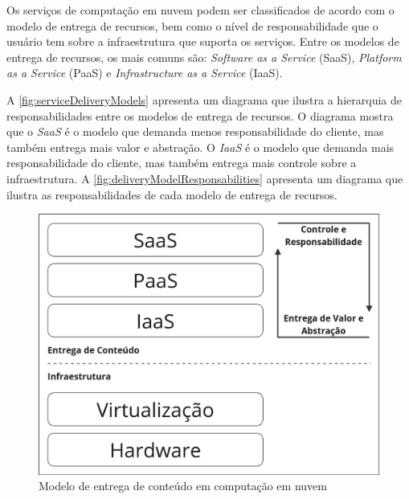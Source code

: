 Os serviços de computação em nuvem podem ser classificados de acordo com o modelo de entrega de recursos, bem como o nível de responsabilidade que o usuário tem sobre a infraestrutura que suporta os serviços. Entre os modelos de entrega de recursos, os mais comuns são: \textit{Software as a Service} (SaaS), \textit{Platform as a Service} (PaaS) e \textit{Infrastructure as a Service} (IaaS). \citep{cloudcomputingcambridge}

A \autoref{fig:serviceDeliveryModels} apresenta um diagrama que ilustra a hierarquia de responsabilidades entre os modelos de entrega de recursos. O diagrama mostra que o \textit{SaaS} é o modelo que demanda menos responsabilidade do cliente, mas também entrega mais valor e abstração. O \textit{IaaS} é o modelo que demanda mais responsabilidade do cliente, mas também entrega mais controle sobre a infraestrutura. A \autoref{fig:deliveryModelResponsabilities} apresenta um diagrama que ilustra as responsabilidades de cada modelo de entrega de recursos. \citep{cloudcomputingcambridge}

\begin{figure}[H]
\captionsetup{width=.7\textwidth}%
\caption{Modelo de entrega de conteúdo em computação em nuvem}
\label{fig:serviceDeliveryModels}
\includegraphics[width=.7\textwidth]{capitulos/1-revisao-da-literatura/files/deliovery-model.png}
\end{figure}

